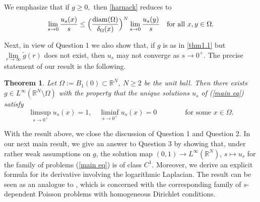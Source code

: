 \documentclass[notitlepage,11pt,reqno]{amsart}
\newtheorem{theorem}{Theorem}[section]
\theoremstyle{definition}
\numberwithin{equation}{section}
\newcommand{\R}{\mathds{R}}
\newcommand{\RR}{\mathds{R}}
\DeclareMathOperator*{\diam}{diam}
\begin{document}
We emphasize that if $g\geq 0, $ then \eqref{harnack} reduces to
\begin{align*}
 \lim_{s\to 0}\frac{u_s(x)}{s}\leq \Bigl(\frac{\diam(\Omega)}{\delta_\Omega(x)}\Bigr)^N \lim_{s\to 0}\frac{u_s(y)}{s}\quad\text{for all $x,y\in \Omega$.}
\end{align*}

Next, in view of Question 1 we also show that, if $g$ is as in \cref{thm1.1} but $\lim \limits_{r \to \infty}\tilde g(r)$ does not exist, then $u_s$ may not converge as $s \to 0^+$. The precise statement of our result is the following.

\begin{theorem}\label{thm-limsup-liminf}
  Let $\Omega:= B_1(0) \subset \R^N$, $N \ge 2$ be the unit ball. Then there exists $g \in L^{\infty}(\RR^N\setminus \Omega)$ with the property that the unique solutions $u_s$ of (\ref{main eq}) satisfy%
  \begin{equation}
    \label{eq:limsup-liminf}
  \limsup_{s \to 0^+}u_s(x)=1, \quad \liminf_{s \to 0^+}u_s(x)=0 \qquad \qquad \text{for some $x \in \Omega$.}  
  \end{equation}
\end{theorem}

With the result above, we close the discussion of Question 1 and Question 2. In our next main result, we give an answer to Question 3 by showing that, under rather weak assumptions on $g$, the solution map $(0,1) \to L^\infty(\R^N)$, $s \mapsto u_s$ for the family of problems (\ref{main eq}) is of class $C^1$. Moreover, we derive an explicit formula for its derivative involving the logarithmic Laplacian. The result can be seen as an analogue to \cite[Theorem 1.1]{JSW20}, which is concerned with the corresponding family of $s$-dependent Poisson problems with homogeneous Dirichlet conditions.
\end{document}
